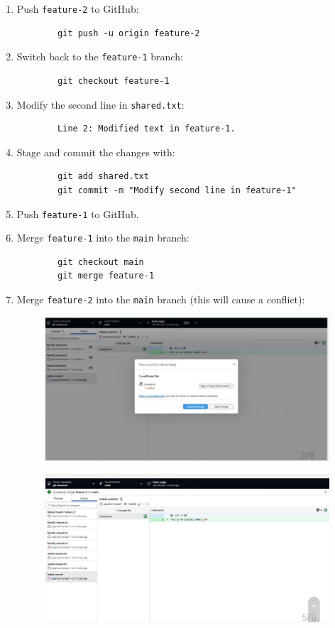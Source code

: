 \documentclass[a4paper,12pt]{article}
\begin{document}
\begin{enumerate}
\begin{verbatim}
        \end{verbatim}
    \item Push \texttt{feature-2} to GitHub:
        \begin{verbatim}
        git push -u origin feature-2
        \end{verbatim}
    \item Switch back to the \texttt{feature-1} branch:
        \begin{verbatim}
        git checkout feature-1
        \end{verbatim}
    \item Modify the second line in \texttt{shared.txt}:
        \begin{verbatim}
        Line 2: Modified text in feature-1.
        \end{verbatim}
    \item Stage and commit the changes with:
        \begin{verbatim}
        git add shared.txt
        git commit -m "Modify second line in feature-1"
        \end{verbatim}
    \item Push \texttt{feature-1} to GitHub.
    \item Merge \texttt{feature-1} into the \texttt{main} branch:
        \begin{verbatim}
        git checkout main
        git merge feature-1
        \end{verbatim}
    \item Merge \texttt{feature-2} into the \texttt{main} branch (this will cause a conflict):
    \vspace{1 cm}
\begin{figure}[h!]
   \centering
    \includegraphics[width=0.5\linewidth]{conflict.jpg}
\end{figure}
\vspace{0.5 cm}
 \vspace{1 cm}
\begin{figure}[h!]
   \centering
    \includegraphics[width=0.5\linewidth]{History.jpg}
\end{figure}
\vspace{0.5 cm}


\end{enumerate}
\end{document}
